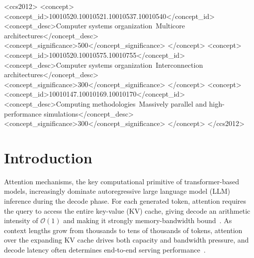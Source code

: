 \documentclass[sigconf, review, anonymous]{acmart}
\begin{document}
\begin{CCSXML}
<ccs2012>
 <concept>
  <concept_id>10010520.10010521.10010537.10010540</concept_id>
  <concept_desc>Computer systems organization~Multicore architectures</concept_desc>
  <concept_significance>500</concept_significance>
 </concept>
 <concept>
  <concept_id>10010520.10010575.10010755</concept_id>
  <concept_desc>Computer systems organization~Interconnection architectures</concept_desc>
  <concept_significance>300</concept_significance>
 </concept>
 <concept>
  <concept_id>10010147.10010169.10010170</concept_id>
  <concept_desc>Computing methodologies~Massively parallel and high-performance simulations</concept_desc>
  <concept_significance>300</concept_significance>
 </concept>
</ccs2012>
\end{CCSXML}



\maketitle


\section{Introduction}\label{sec:intro}

Attention mechanisms, the key computational primitive of
transformer-based models, increasingly dominate autoregressive large
language model (LLM) inference during the decode phase.  For each
generated token, attention requires the query to access the entire
key-value (KV) cache, giving decode an arithmetic intensity of
$\mathcal{O}(1)$ and making it strongly memory-bandwidth
bound~\cite{pope2023efficiently}.  As context lengths grow from
thousands to tens of thousands of tokens, attention over the expanding
KV cache drives both capacity and bandwidth pressure, and decode
latency often determines end-to-end serving
performance~\cite{kwon2023pagedattention, zhong2024distserve}.
\end{document}
